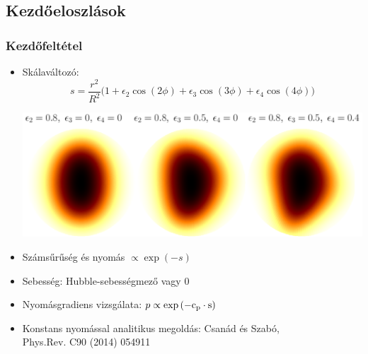 \documentclass{beamer}
\begin{document}
\subsection{Kezdőeloszlások}
\begin{frame}
\frametitle{Kezdőfeltétel}
\begin{itemize}
  \setlength{\itemsep}{8pt}

\item<1-> Skálaváltozó: 
\begin{equation*}
s=\frac{r^2}{R^2}\Big(1+\epsilon_2\cos(2\phi)+\epsilon_3\cos(3\phi)+\epsilon_4\cos(4\phi)\Big)
\end{equation*}
\begin{center}
\includegraphics[scale=0.15]{pic/ic}
\end{center}
\item<1-> Számsűrűség és nyomás \large{$\propto \exp{(-s)}$}
\item<1-> Sebesség: Hubble-sebességmező vagy $0$
\item<2-> Nyomásgradiens vizsgálata: \large{$p \propto \exp{(-\rm{c_p}\cdot s)}$}
\item<2-> Konstans nyomással analitikus megoldás: Csanád és Szabó, \\Phys.Rev. C90 (2014) 054911
\end{itemize}
\end{frame}
\end{document}
